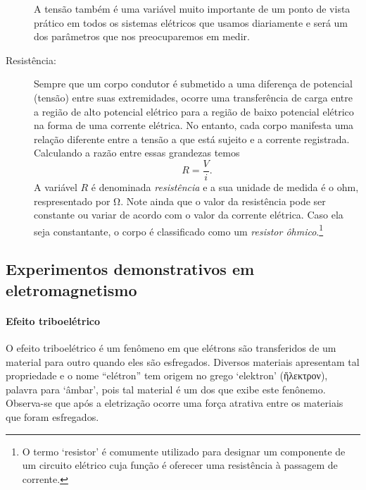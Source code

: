 \begin{description}
    A tensão também é uma variável muito importante de um ponto de vista prático em todos os sistemas elétricos que usamos diariamente e será um dos parâmetros que nos preocuparemos em medir.
    
    \item[Resistência:] Sempre que um corpo condutor é submetido a uma diferença de potencial (tensão) entre suas extremidades, ocorre uma transferência de carga entre a região de alto potencial elétrico para a região de baixo potencial elétrico na forma de uma corrente elétrica. No entanto, cada corpo manifesta uma relação diferente entre a tensão a que está sujeito e a corrente registrada. Calculando a razão entre essas grandezas temos
    \begin{equation}
        R = \frac{V}{i}.
    \end{equation}
    A variável $R$ é denominada \emph{resistência} e a sua unidade de medida é o ohm, respresentado por \si{\ohm}. Note ainda que o valor da resistência pode ser constante ou variar de acordo com o valor da corrente elétrica. Caso ela seja constantante, o corpo é classificado como um \emph{resistor ôhmico}.\footnote{O termo `resistor' é comumente utilizado para designar um componente de um circuito elétrico cuja função é oferecer uma resistência à passagem de corrente.}
    
\end{description}

\subsection{Experimentos demonstrativos em eletromagnetismo}

\paragraph{Efeito triboelétrico}

O efeito triboelétrico é um fenômeno em que elétrons são transferidos de um material para outro quando eles são esfregados. Diversos materiais apresentam tal propriedade e o nome ``elétron'' tem origem no grego `elektron' (ἤλεκτρον), palavra para `âmbar', pois tal material é um dos que exibe este fenônemo. Observa-se que após a eletrização ocorre uma força atrativa entre os materiais que foram esfregados.

